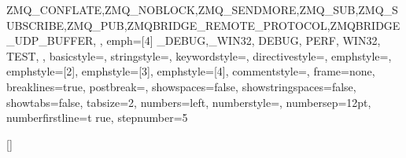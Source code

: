 {{		ZMQ_CONFLATE,ZMQ_NOBLOCK,ZMQ_SENDMORE,ZMQ_SUB,ZMQ_SUBSCRIBE,ZMQ_PUB,ZMQBRIDGE_REMOTE_PROTOCOL,ZMQBRIDGE_UDP_BUFFER,
	},
	emph={[4]
		_DEBUG,_WIN32,
		DEBUG,
		PERF,
		WIN32,
		TEST,
	},
	basicstyle=\FONTsizetwo\FONTmonospaceseries,
	stringstyle=,
	keywordstyle=,
	directivestyle={},
	emphstyle=,
	emphstyle={[2]},
	emphstyle={[3]},
	emphstyle={[4]},
	commentstyle=,
	frame=none,
	breaklines=true,
	postbreak=,
	showspaces=false,
	showstringspaces=false,
	showtabs=false,
	tabsize=2,
	numbers=left,
	numberstyle=\FONTsizeone{},
	numbersep=12pt,
	numberfirstline=t rue,
	stepnumber=5
}




\SIUNITXnewunit{}
\SIUNITXnewunit{}


\renewcommand\tabularxcolumn[1]{m{#1}}



\TITLESECformat{\chapter}{\FLOATpushrightpage\FONTnormalseries\FONTsizenine\FONTboldseries}{\thechapter}{1em}{}[\GLOSSARIESreset]

\TITLESECformat{\part}{\FLOATcenter\FONTnormalseries\FONTsizenine\FONTboldseries}{\FONTuppercaseseries{\TITLESECpartname~\TITLESECpartnum}}{0pt}{\\\FLOATverticalspace{2pc}}


\renewcommand{\cftdot}{}


\renewcommand{\UrlFont}{\FONTmonospace\FONTsizetwo}


